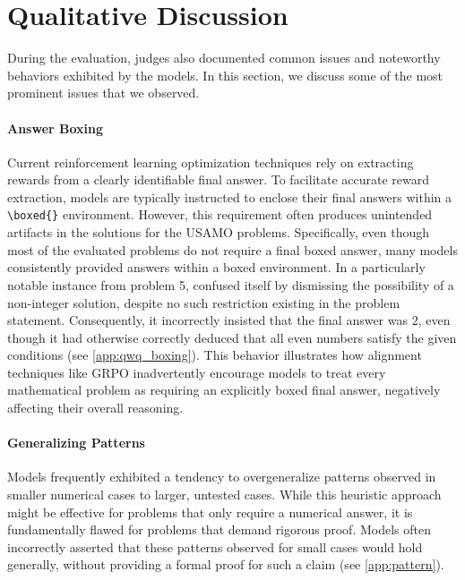 \vspace{-1mm}
\section{Qualitative Discussion}\label{sec:discussion}
\vspace{-1mm}

During the evaluation, judges also documented common issues and noteworthy behaviors exhibited by the models. In this section, we discuss some of the most prominent issues that we observed.

\vspace{-1mm}
\paragraph{Answer Boxing}
Current reinforcement learning optimization techniques rely on extracting rewards from a clearly identifiable final answer. To facilitate accurate reward extraction, models are typically instructed to enclose their final answers within a \texttt{\textbackslash boxed\{\}} environment. However, this requirement often produces unintended artifacts in the solutions for the USAMO problems. Specifically, even though most of the evaluated problems do not require a final boxed answer, many models consistently provided answers within a boxed environment. In a particularly notable instance from problem 5, \qwq{} confused itself by dismissing the possibility of a non-integer solution, despite no such restriction existing in the problem statement. Consequently, it incorrectly insisted that the final answer was $2$, even though it had otherwise correctly deduced that all even numbers satisfy the given conditions (see \cref{app:qwq_boxing}). This behavior illustrates how alignment techniques like GRPO \citep{grpo} inadvertently encourage models to treat every mathematical problem as requiring an explicitly boxed final answer, negatively affecting their overall reasoning.

\vspace{-1mm}
\paragraph{Generalizing Patterns}
Models frequently exhibited a tendency to overgeneralize patterns observed in smaller numerical cases to larger, untested cases. While this heuristic approach might be effective for problems that only require a numerical answer, it is fundamentally flawed for problems that demand rigorous proof. Models often incorrectly asserted that these patterns observed for small cases would hold generally, without providing a formal proof for such a claim (see \cref{app:pattern}).

